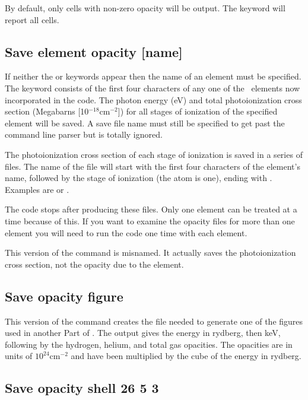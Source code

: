 By default, only cells with non-zero opacity will be output.  
The keyword  will report all cells.

\subsection{Save element opacity [name]}

If neither the  or  keywords appear then the name of an element must be specified.
The keyword consists of the first four characters of
any one of the \LIMELM\ elements now incorporated in the code.
The photon energy
(eV) and total photoionization cross section (Megabarns [10$^{-18}
\mathrm{cm}^{-2}$]) for
all stages of ionization of the specified element will be saved.
A save
file name must still be specified to get past the command line parser but
is totally ignored.

The photoionization cross section of each stage of ionization is saved
in a series of files.  The name of the file will start with the first four
characters of the element's name, followed by the stage of ionization (the
atom is one), ending with .  Examples are  or
.

The code stops after producing these files.
Only one element can be treated at a time because of this.
If you want to examine the opacity files for more than one element
you will need to run the code one time with each element.

This version of the  command is misnamed.
It actually saves the photoionization cross section, not the opacity due to the element.

\subsection{Save opacity figure}

This version of the command creates the file needed to generate one of
the figures used in another Part of \Hazy.
The output gives the energy in rydberg,
then keV, following by the hydrogen, helium, and total gas opacities.
The
opacities are in units of $10^{24} \mathrm{cm}^{-2}$ and have been multiplied by the cube
of the energy in rydberg.

\subsection{Save opacity shell 26 5 3}

